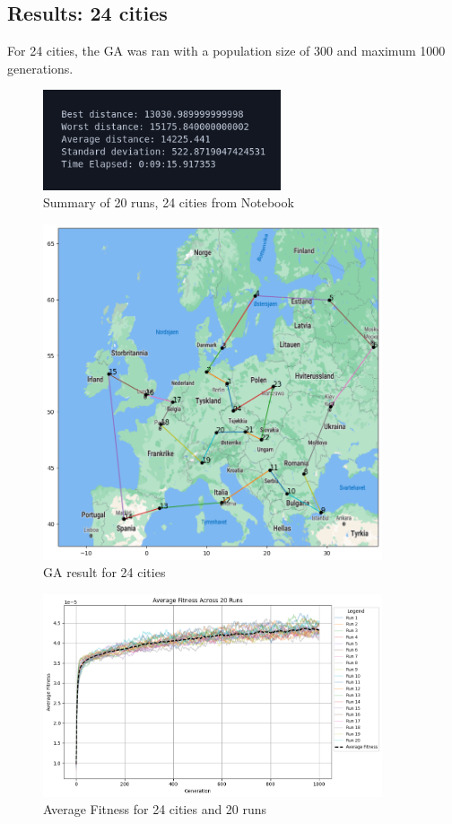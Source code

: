 \documentclass{article}
\begin{document}
    \newpage


    \subsection{Results: 24 cities}

    For 24 cities, the GA was ran with a population size of 300 and maximum 1000 generations.

    \begin{figure}[ht!]
        \includegraphics[width=7cm]{images/ga_24_cities_summary.png}
        \centering
        \caption{Summary of 20 runs, 24 cities from Notebook}
    \end{figure}

    \begin{figure}[ht!]
        \includegraphics[width=10cm]{images/ga_24_cities.png}
        \centering
        \caption{GA result for 24 cities}
    \end{figure}

    \begin{figure}[ht!]
        \includegraphics[width=10cm]{images/ga_24_cities_avg_graph.png}
        \centering
        \caption{Average Fitness for 24 cities and 20 runs}
    \end{figure}
\end{document}
